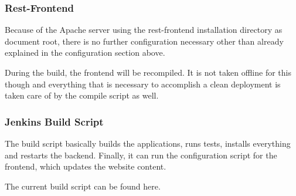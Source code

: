 

\subsubsection*{Rest-\/\+Frontend}

Because of the Apache server using the rest-\/frontend installation directory as document root, there is no further configuration necessary other than already explained in the configuration section above.

During the build, the frontend will be recompiled. It is not taken offline for this though and everything that is necessary to accomplish a clean deployment is taken care of by the compile script as well.

\subsubsection*{Jenkins Build Script}

The build script basically builds the applications, runs tests, installs everything and restarts the backend. Finally, it can run the configuration script for the frontend, which updates the website content.

The current build script can be found here. 